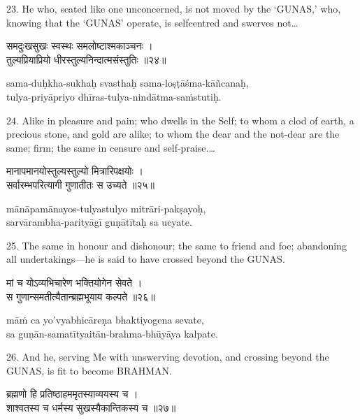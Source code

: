 23. He who, seated like one unconcerned, is not moved by the `GUNAS,' who,
knowing that the `GUNAS' operate, is selfcentred and swerves not\ldots

\begin{gitaverse}
समदुःखसुखः स्वस्थः समलोष्टाश्मकाञ्चनः । \\
तुल्यप्रियाप्रियो धीरस्तुल्यनिन्दात्मसंस्तुतिः ॥२४॥
\end{gitaverse}

\begin{transliteration}
sama-duḥkha-sukhaḥ svasthaḥ sama-loṣṭāśma-kāñcanaḥ, \\
tulya-priyāpriyo dhīras-tulya-nindātma-saṁstutiḥ.
\end{transliteration}

24. Alike in pleasure and pain; who dwells in the Self; to whom a clod of
earth, a precious stone, and gold are alike; to whom the dear and the not-dear
are the same; firm; the same in censure and self-praise.\ldots

\begin{gitaverse}
मानापमानयोस्तुल्यस्तुल्यो मित्रारिपक्षयोः । \\
सर्वारम्भपरित्यागी गुणातीतः स उच्यते ॥२५॥
\end{gitaverse}

\begin{transliteration}
mānāpamānayos-tulyastulyo mitrāri-pakṣayoḥ, \\
sarvārambha-parityāgī guṇātītaḥ sa ucyate.
\end{transliteration}

25. The same in honour and dishonour; the same to friend and foe; abandoning
all undertakings---he is said to have crossed beyond the GUNAS.\@

\begin{gitaverse}
मां च योऽव्यभिचारेण भक्तियोगेन सेवते । \\
स गुणान्समतीत्यैतान्ब्रह्मभूयाय कल्पते ॥२६॥
\end{gitaverse}

\begin{transliteration}
māṁ ca yo'vyabhicāreṇa bhaktiyogena sevate, \\
sa guṇān-samatītyaitān-brahma-bhūyāya kalpate.
\end{transliteration}

26. And he, serving Me with unswerving devotion, and crossing beyond the GUNAS,
is fit to become BRAHMAN.\@

\begin{gitaverse}
ब्रह्मणो हि प्रतिष्ठाहममृतस्याव्ययस्य च । \\
शाश्वतस्य च धर्मस्य सुखस्यैकान्तिकस्य च ॥२७॥
\end{gitaverse}


